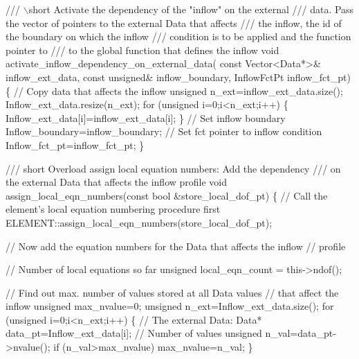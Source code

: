 \begin{DoxyCodeInclude}
\textcolor{comment}{}
\textcolor{comment}{ /// \(\backslash\)short Activate the dependency of the "inflow" on the external}
\textcolor{comment}{ /// data. Pass the vector of pointers to the external Data that affects}
\textcolor{comment}{ /// the inflow, the id of the boundary on which the inflow}
\textcolor{comment}{ /// condition is to be applied and the function pointer to }
\textcolor{comment}{ /// to the global function that defines the inflow}
\textcolor{comment}{} \textcolor{keywordtype}{void} activate\_inflow\_dependency\_on\_external\_data(
  \textcolor{keyword}{const} Vector<Data*>& inflow\_ext\_data,
  \textcolor{keyword}{const} \textcolor{keywordtype}{unsigned}& inflow\_boundary,
  InflowFctPt inflow\_fct\_pt)
  \{
   \textcolor{comment}{// Copy data that affects the inflow}
   \textcolor{keywordtype}{unsigned} n\_ext=inflow\_ext\_data.size();
   Inflow\_ext\_data.resize(n\_ext);
   \textcolor{keywordflow}{for} (\textcolor{keywordtype}{unsigned} i=0;i<n\_ext;i++)
    \{
     Inflow\_ext\_data[i]=inflow\_ext\_data[i];
    \}
   \textcolor{comment}{// Set inflow boundary}
   Inflow\_boundary=inflow\_boundary;
   \textcolor{comment}{// Set fct pointer to inflow condition}
   Inflow\_fct\_pt=inflow\_fct\_pt;
  \}
 
\textcolor{comment}{}
\textcolor{comment}{ /// short Overload assign local equation numbers: Add the dependency }
\textcolor{comment}{ /// on the external Data that affects the inflow profile}
\textcolor{comment}{} \textcolor{keywordtype}{void} assign\_local\_eqn\_numbers(\textcolor{keyword}{const} \textcolor{keywordtype}{bool}  &store\_local\_dof\_pt)
  \{
   \textcolor{comment}{// Call the element's local equation numbering procedure first}
   ELEMENT::assign\_local\_eqn\_numbers(store\_local\_dof\_pt);
   
   \textcolor{comment}{// Now add the equation numbers for the Data that affects the inflow}
   \textcolor{comment}{// profile}
   
   \textcolor{comment}{// Number of local equations so far}
   \textcolor{keywordtype}{unsigned} local\_eqn\_count = this->ndof();
   
   \textcolor{comment}{// Find out max. number of values stored at all Data values }
   \textcolor{comment}{// that affect the inflow}
   \textcolor{keywordtype}{unsigned} max\_nvalue=0;
   \textcolor{keywordtype}{unsigned} n\_ext=Inflow\_ext\_data.size();
   \textcolor{keywordflow}{for} (\textcolor{keywordtype}{unsigned} i=0;i<n\_ext;i++)
    \{
     \textcolor{comment}{// The external Data:}
     Data* data\_pt=Inflow\_ext\_data[i];
     \textcolor{comment}{// Number of values}
     \textcolor{keywordtype}{unsigned} n\_val=data\_pt->nvalue();
     \textcolor{keywordflow}{if} (n\_val>max\_nvalue) max\_nvalue=n\_val;
    \}


\end{DoxyCodeInclude}
